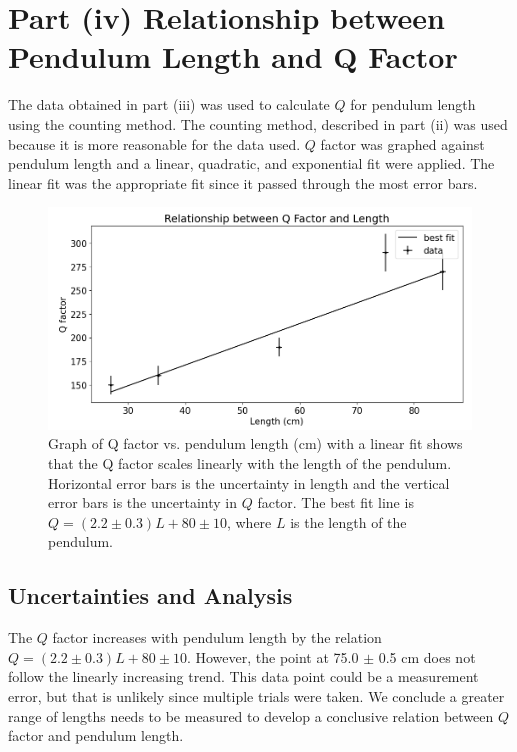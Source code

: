 \documentclass[notitlepage, twocolumn, 12pt]{article}
\begin{document}
    \section*{Part (iv) Relationship between Pendulum Length and Q Factor}
    The data obtained in part (iii) was used to calculate $Q$ for pendulum length using the counting method. The counting method, described in part (ii) was used because it is more reasonable for the data used.  $Q$ factor was graphed against pendulum length and a linear, quadratic, and exponential fit were applied. The linear fit was the appropriate fit since it passed through the most error bars. 
    \begin{figure}[H]
        \includegraphics[width=\linewidth]{qfactorvslength.png}
        \caption{Graph of Q factor vs. pendulum length (cm) with a linear fit shows that the Q factor scales linearly with the length of the pendulum. Horizontal error bars is the uncertainty in length and the vertical error bars is the uncertainty in $Q$ factor. The best fit line is $Q = (2.2 \pm 0.3)L + 80 \pm 10$, where $L$ is the length of the pendulum.  }
        \label{fig:qfactorvslength}
    \end{figure} 

    \subsection*{Uncertainties and Analysis}
    The $Q$ factor increases with pendulum length by the relation $Q = (2.2 \pm 0.3)L + 80 \pm 10$. However, the point at  75.0 $\pm$ 0.5 cm does not follow the linearly increasing trend. This data point could be a measurement error, but that is unlikely since multiple trials were taken. We conclude a greater range of lengths needs to be measured to develop a conclusive relation between $Q$ factor and pendulum length.  
\end{document}
